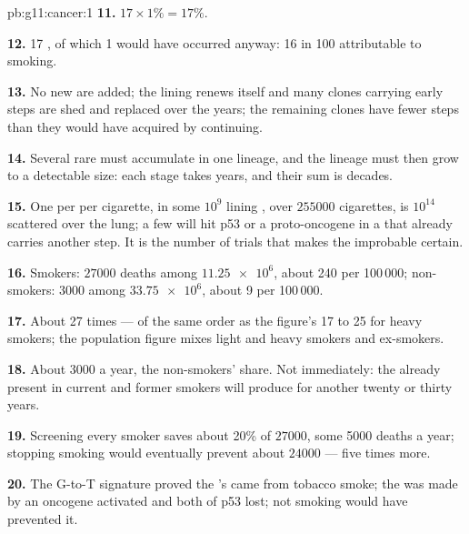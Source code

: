 \begin{solution}{pb:g11:cancer:1}
\textbf{11.} $17 \times 1\% = 17\%$.

\textbf{12.} 17 , of which 1 would have occurred anyway: 16 in
100 attributable to smoking.

\textbf{13.} No new  are added; the lining renews itself and
many clones carrying early steps are shed and replaced over the
years; the remaining clones have fewer steps than they would have
acquired by continuing.

\textbf{14.} Several rare  must accumulate in one lineage,
and the lineage must then grow to a detectable size: each stage takes
years, and their sum is decades.

\textbf{15.} One  per  per cigarette, in some $10^9$
lining , over $\num{255000}$ cigarettes, is $10^{14}$ 
scattered over the lung; a few will hit p53 or a proto-oncogene in a
 that already carries another step. It is the number of trials
that makes the improbable certain.

\textbf{16.} Smokers: $\num{27000}$ deaths among $\num{11.25e6}$, about
240 per 100\,000; non-smokers: 3000 among $\num{33.75e6}$, about 9 per
100\,000.

\textbf{17.} About 27 times --- of the same order as the figure's 17
to 25 for heavy smokers; the population figure mixes light and heavy
smokers and ex-smokers.

\textbf{18.} About 3000 a year, the non-smokers' share. Not
immediately: the  already present in current and former
smokers will produce  for another twenty or thirty years.

\textbf{19.} Screening every smoker saves about 20\% of
$\num{27000}$, some 5000 deaths a year; stopping smoking would
eventually prevent about $\num{24000}$ --- five times more.

\textbf{20.} The G-to-T signature proved the 's  came
from tobacco smoke; the  was made by an oncogene activated and
both  of p53 lost; not smoking would have prevented it.
\end{solution}
